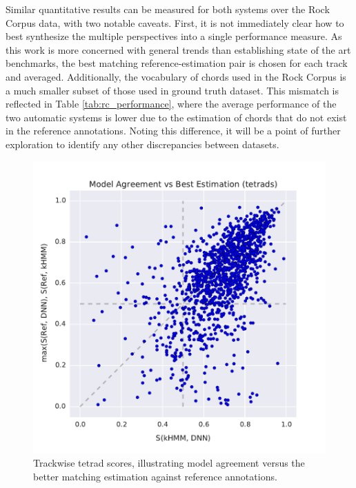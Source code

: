 \documentclass{article}
\begin{document}
Similar quantitative results can be measured for both systems over the Rock Corpus data, with two notable caveats.
First, it is not immediately clear how to best synthesize the multiple perspectives into a single performance measure.
As this work is more concerned with general trends than establishing state of the art benchmarks, the best matching reference-estimation pair is chosen for each track and averaged.
Additionally, the vocabulary of chords used in the Rock Corpus is a much smaller subset of those used in ground truth dataset.
This mismatch is reflected in Table \ref{tab:rc_performance}, where the average performance of the two automatic systems is lower due to the estimation of chords that do not exist in the reference annotations.
Noting this difference, it will be a point of further exploration to identify any other discrepancies between datasets.


\begin{figure}[t]
\centering
\includegraphics[width=\columnwidth]{model_agreement-vs-best_est}
\caption{Trackwise tetrad scores, illustrating model agreement versus the better matching estimation against reference annotations.}
\label{fig:model_agreement}
\end{figure}
\end{document}

